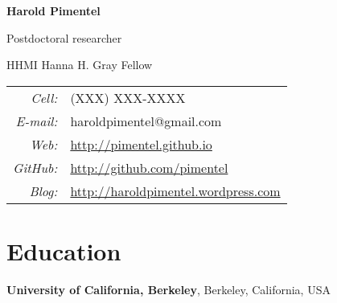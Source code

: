 \documentclass[11pt,notitlepage]{article} %
\begin{document}
\thispagestyle{firststyle}





\begin{center}
  {\Huge \bf Harold Pimentel}

  \medskip
  {\large Postdoctoral researcher}

  \medskip

  {\large HHMI Hanna H. Gray Fellow}
\end{center}
\bigskip
\begin{tabular}{r l}
  {\it Cell:}&  {(XXX) XXX-XXXX} \\
  {\it E-mail:}&  {haroldpimentel@gmail.com} \\
  {\it Web:}& {\url{http://pimentel.github.io}} \\
  {\it GitHub:}& {\url{http://github.com/pimentel}} \\
  {\it Blog:}& {\url{http://haroldpimentel.wordpress.com}} \\
\end{tabular}


\bigskip
\section*{Education}
\medskip

{\bf University of California, Berkeley}, Berkeley, California, USA
\end{document}
